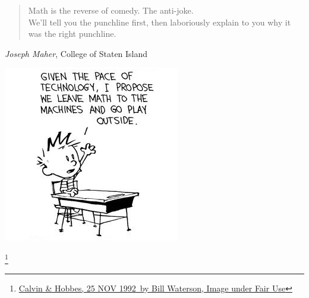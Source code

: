 \documentclass[aspectratio=43]{beamer}
\newcommand\blfootnote[1]{%
  \begingroup
  \renewcommand\thefootnote{}\footnote{#1}%
  \addtocounter{footnote}{-1}%
  \endgroup
}
\begin{document}

\begin{frame}
\begin{quote}
    Math is the reverse of comedy. The anti-joke.\\
    We'll tell you the punchline first, then
    laboriously explain to you
    why it was the right punchline.
\end{quote}
\begin{center}
\textit{Joseph Maher}, College of Staten Island 
\end{center}

\end{frame}


\begin{frame}
\begin{center}
\includegraphics[scale=0.7]{images/go_play_outside.jpg} 
\end{center}
\blfootnote{\href{http://www.gocomics.com/calvinandhobbes/1992/11/25}{\glqq Calvin \& Hobbes, 25 NOV 1992\grqq\ by Bill Waterson, Image under Fair Use}}
\end{frame}

\end{document}
